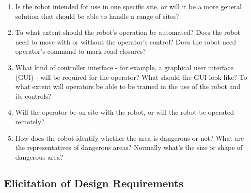 \documentclass[11pt, a4paper]{article}
\begin{document}
\begin{enumerate}

\item Is the robot intended for use in one specific site, or will it be a more general solution that should be able to handle a range of sites?

\vspace*{10pt}

\item To what extent should the robot's operation be automated? Does the robot need to move with or without the operator's control? Does the robot need operator's command to mark road closures?

\vspace*{10pt}

\item What kind of controller interface - for example, a graphical user interface (GUI) - will be required for the operator? What should the GUI look like? To what extent will operators be able to be trained in the use of the robot and its controls?

\vspace*{10pt}

\item Will the operator be on site with the robot, or will the robot be operated remotely?

\vspace*{10pt}

\item How does the robot identify whether the area is dangerous or not? What
are the representatives of dangerous areas? Normally what's the size or shape of dangerous area?

\vspace*{10pt}

\end{enumerate}
 

\subsection{Elicitation of Design Requirements}
\end{document}
